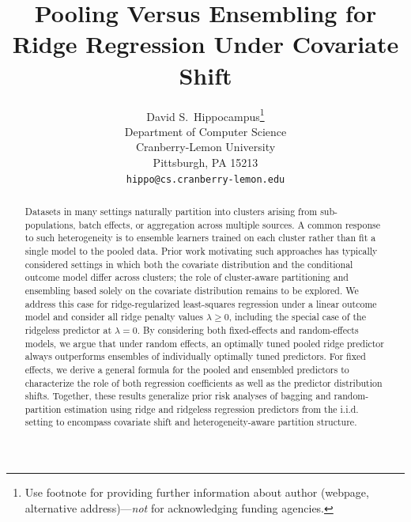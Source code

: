 \documentclass{article}
\title{Pooling Versus Ensembling for Ridge Regression Under Covariate Shift}
\author{%
  David S.~Hippocampus\thanks{Use footnote for providing further information
    about author (webpage, alternative address)---\emph{not} for acknowledging
    funding agencies.} \\
  Department of Computer Science\\
  Cranberry-Lemon University\\
  Pittsburgh, PA 15213 \\
  \texttt{hippo@cs.cranberry-lemon.edu} \\
}
\theoremstyle{plain}
\theoremstyle{remark}
\begin{document}
\maketitle


\begin{abstract}


Datasets in many settings naturally partition into clusters arising from sub-populations, batch effects, or aggregation across multiple sources. A common response to such heterogeneity is to ensemble learners trained on each cluster rather than fit a single model to the pooled data. Prior work motivating such approaches has typically considered settings in which both the covariate distribution and the conditional outcome model differ across clusters; the role of cluster-aware partitioning and ensembling based solely on the covariate distribution remains to be explored. We address this case for ridge-regularized least-squares regression under a linear outcome model and consider all ridge penalty values $\lambda \geq 0$, including the special case of the ridgeless predictor at $\lambda = 0$. By considering both fixed-effects and random-effects models, we argue that under random effects, an optimally tuned pooled ridge predictor always outperforms ensembles of individually optimally tuned predictors. For fixed effects, we derive a general formula for the pooled and ensembled predictors to characterize the role of both regression coefficients as well as the predictor distribution shifts. %
Together, these results generalize prior risk analyses of bagging and random-partition estimation using ridge and ridgeless regression predictors from the i.i.d. setting to encompass covariate shift and heterogeneity-aware partition structure.
\end{abstract}
\end{document}
